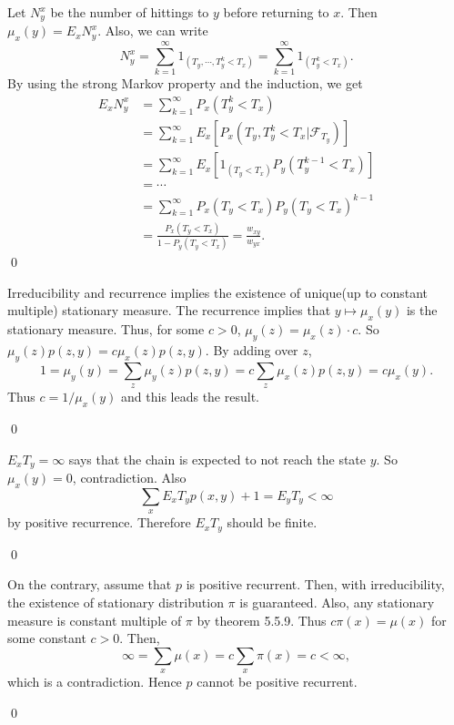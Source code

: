 \begin{problem}[5.5.2] \hfill

	Let $N_y^x$ be the number of hittings to $y$ before returning to $x$.
	Then $\mu_x(y) = E_xN_y^x$.
	Also, we can write
	\[
		N_y^x = \sum_{k=1}^\infty 1_{\left (T_y, \cdots, T_y^k < T_x \right )} = \sum_{k=1}^\infty 1_{\left( T_y^k < T_x \right)}.
	\]
	By using the strong Markov property and the induction, we get
	\[
		\begin{split}
			E_x N_y^x
			&= \sum_{k=1}^\infty P_x\left( T_y^k < T_x \right) \\
			&= \sum_{k=1}^\infty E_x\left[ P_x\left( T_y, T_y^k < T_x \lvert \mathcal{F}_{T_y} \right) \right] \\
			&= \sum_{k=1}^\infty E_x\left[ 1_{\left( T_y < T_x \right)}P_y\left( T_y^{k-1} < T_x \right) \right] \\
			&= \cdots \\
			&= \sum_{k=1}^\infty P_x(T_y < T_x) P_y(T_y < T_x)^{k-1} \\
			&= \frac{P_x(T_y < T_x)}{1-P_y(T_y<T_x)} = \frac{w_{xy}}{w_{yx}}.
		\end{split}
	\]
	\qed
\end{problem}

\begin{problem}[5.5.3] \hfill

	Irreducibility and recurrence implies the existence of unique(up to constant multiple) stationary measure.
	The recurrence implies that $y \mapsto \mu_x(y)$ is the stationary measure.
	Thus, for some $c>0$, $\mu_y(z) = \mu_x(z) \cdot c$.
	So $\mu_y(z)p(z, y) = c \mu_x(z)p(z, y)$.
	By adding over $z$,
	\[
		1 = \mu_y(y) = \sum_z \mu_y(z)p(z, y) = c\sum_z \mu_x(z)p(z, y) = c\mu_x(y).
	\]
	Thus $c = 1/\mu_x(y)$ and this leads the result.

	\qed
\end{problem}

\begin{problem}[5.5.4] \hfill
	
	$E_x T_y = \infty$ says that the chain is expected to not reach the state $y$.
	So $\mu_x(y) = 0$, contradiction.
	Also
	\[
		\sum_x E_x T_y p(x, y) + 1 = E_y T_y < \infty
	\]
	by positive recurrence.
	Therefore $E_x T_y$ should be finite.

	\qed
\end{problem}

\begin{problem}[5.5.5] \hfill
	
	On the contrary, assume that $p$ is positive recurrent.
	Then, with irreducibility, the existence of stationary distribution $\pi$ is guaranteed.
	Also, any stationary measure is constant multiple of $\pi$ by theorem 5.5.9.
	Thus $c \pi(x) = \mu(x)$ for some constant $c>0$.
	Then,
	\[
		\infty = \sum_x \mu(x) = c \sum_x \pi(x) = c < \infty,
	\]
	which is a contradiction.
	Hence $p$ cannot be positive recurrent.

	\qed
\end{problem}

